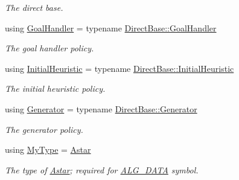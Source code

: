 \begin{DoxyCompactItemize}
\begin{DoxyCompactList}\small\item\em The direct base. \end{DoxyCompactList}\item 
using \hyperlink{structslb_1_1ext_1_1algorithm_1_1Astar_a44bf47362f5c203a2a637c986da15f47}{Goal\+Handler} = typename \hyperlink{structslb_1_1ext_1_1algorithm_1_1Algorithm_ae0c6a75028107e4642e43798f21f4bfc}{Direct\+Base\+::\+Goal\+Handler}\hypertarget{structslb_1_1ext_1_1algorithm_1_1Astar_a44bf47362f5c203a2a637c986da15f47}{}\label{structslb_1_1ext_1_1algorithm_1_1Astar_a44bf47362f5c203a2a637c986da15f47}

\begin{DoxyCompactList}\small\item\em The goal handler policy. \end{DoxyCompactList}\item 
using \hyperlink{structslb_1_1ext_1_1algorithm_1_1Astar_a0d23cb786a79d57e4319e62bc6427d16}{Initial\+Heuristic} = typename \hyperlink{structslb_1_1ext_1_1algorithm_1_1Algorithm_ad1f8f28e7b07f747ef7b7b5bf0643c2d}{Direct\+Base\+::\+Initial\+Heuristic}\hypertarget{structslb_1_1ext_1_1algorithm_1_1Astar_a0d23cb786a79d57e4319e62bc6427d16}{}\label{structslb_1_1ext_1_1algorithm_1_1Astar_a0d23cb786a79d57e4319e62bc6427d16}

\begin{DoxyCompactList}\small\item\em The initial heuristic policy. \end{DoxyCompactList}\item 
using \hyperlink{structslb_1_1ext_1_1algorithm_1_1Astar_a8e7c4ac827051423153a315c7b404119}{Generator} = typename \hyperlink{structslb_1_1ext_1_1algorithm_1_1Algorithm_afa5a78c048b4fe4f5848aeaf5c1f8d65}{Direct\+Base\+::\+Generator}\hypertarget{structslb_1_1ext_1_1algorithm_1_1Astar_a8e7c4ac827051423153a315c7b404119}{}\label{structslb_1_1ext_1_1algorithm_1_1Astar_a8e7c4ac827051423153a315c7b404119}

\begin{DoxyCompactList}\small\item\em The generator policy. \end{DoxyCompactList}\item 
using \hyperlink{structslb_1_1ext_1_1algorithm_1_1Astar_a49c5252e4f03e05f60409d22beaf4c8e}{My\+Type} = \hyperlink{structslb_1_1ext_1_1algorithm_1_1Astar}{Astar}\hypertarget{structslb_1_1ext_1_1algorithm_1_1Astar_a49c5252e4f03e05f60409d22beaf4c8e}{}\label{structslb_1_1ext_1_1algorithm_1_1Astar_a49c5252e4f03e05f60409d22beaf4c8e}

\begin{DoxyCompactList}\small\item\em The type of \hyperlink{structslb_1_1ext_1_1algorithm_1_1Astar}{Astar}; required for \hyperlink{algorithm_8h_a64c012078deee9a30405e18ec11e6360}{A\+L\+G\+\_\+\+D\+A\+TA} symbol. \end{DoxyCompactList}\end{DoxyCompactItemize}
